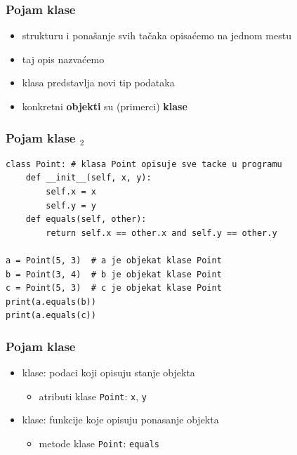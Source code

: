\documentclass[utf8,compress,aspectratio=169]{beamer}
\begin{document}
\begin{frame}[fragile]
  \frametitle{Pojam klase}
  \begin{itemize}
    \item strukturu i ponašanje svih tačaka opisaćemo na jednom mestu
    \item taj opis nazvaćemo 
    \item klasa predstavlja novi tip podataka
    \item konkretni \textbf{objekti} su  (primerci) \textbf{klase}
  \end{itemize}
\end{frame}

\begin{frame}[fragile]
  \frametitle{Pojam klase $_2$}
\begin{verbatim}
class Point: # klasa Point opisuje sve tacke u programu
    def __init__(self, x, y):
        self.x = x
        self.y = y
    def equals(self, other):
        return self.x == other.x and self.y == other.y

a = Point(5, 3)  # a je objekat klase Point
b = Point(3, 4)  # b je objekat klase Point
c = Point(5, 3)  # c je objekat klase Point
print(a.equals(b))
print(a.equals(c))
\end{verbatim}
\end{frame}

\begin{frame}[fragile]
  \frametitle{Pojam klase}
  \begin{itemize}
    \item {} klase: podaci koji opisuju stanje objekta
    \begin{itemize}
      \item atributi klase \texttt{Point}: \texttt{x}, \texttt{y}
    \end{itemize}
    \item {} klase: funkcije koje opisuju ponasanje objekta
    \begin{itemize}
      \item metode klase \texttt{Point}: \texttt{equals}
    \end{itemize}
  \end{itemize}
\end{frame}
\end{document}

